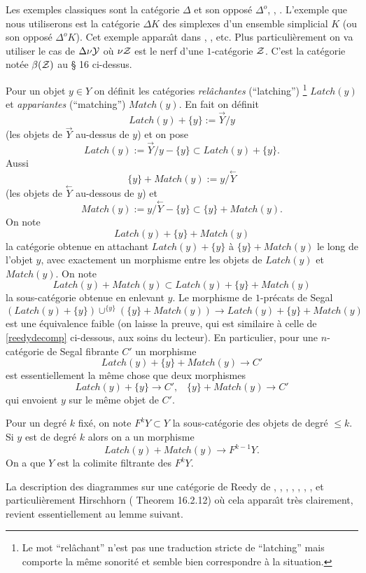 \documentclass[12pt]{article}
\newcommand{\Yy}{{\cal Y}}
\newcommand{\Zz}{{\cal Z}}
\newcommand{\direct}[1]{\stackrel{\rightarrow}{#1}}
\newcommand{\inverse}[1]{\stackrel{\leftarrow}{#1}}
\begin{document}
Les exemples classiques sont la cat\'egorie $\Delta$ et son oppos\'e $\Delta
^o$, \cite{BousfieldKan}, \cite{Reedy}.
L'exemple que nous utiliserons est la cat\'egorie $\Delta K$ des simplexes d'un
ensemble simplicial $K$ (ou son oppos\'e $\Delta ^oK$). Cet exemple
appara\^{\i}t
dans \cite{Hirschhorn}, \cite{DHK}, etc. Plus particuli\`erement on va utiliser
le cas de $\Delta \nu \Yy$ o\`u $\nu \Zz$ est le nerf d'une
$1$-cat\'egorie $\Zz$. C'est la cat\'egorie not\'ee $\beta (\Zz )$ au \S
16 ci-dessus.




Pour un objet $y\in Y$ on d\'efinit les cat\'egories
{\em rel\^achantes} (``latching'')
\footnote{
Le mot ``rel\^achant'' n'est pas une traduction stricte de
``latching'' mais comporte la m\^eme sonorit\'e et semble
bien correspondre \`a la situation.}
$Latch(y)$
et {\em appariantes} (``matching'') $Match(y)$.
En fait on d\'efinit
$$
Latch(y)+\{ y\} := \direct{Y}/y
$$
(les objets de $\direct{Y}$ au-dessus de $y$)
et on pose
$$
Latch(y):= \direct{Y}/y -\{ y\} \subset Latch(y)+\{ y\} .
$$
Aussi
$$
\{ y\} + Match(y):= y/\inverse{Y}
$$
(les objets de $\inverse{Y}$ au-dessous de $y$)
et
$$
Match(y):= y/\inverse{Y} -\{ y\} \subset \{ y\} + Match(y).
$$
On note
$$
Latch(y)+ \{ y\} + Match(y)
$$
la cat\'egorie obtenue en attachant $Latch(y)+\{ y\} $ \`a
$\{ y\} + Match(y) $ le long de
l'objet $y$, avec exactement un morphisme entre les objets de $Latch(y)$ et
$Match(y)$. On note
$$
Latch(y)+Match(y)\subset Latch(y)+ \{ y\} + Match(y)
$$
la sous-cat\'egorie obtenue en enlevant $y$.
Le morphisme de $1$-pr\'ecats de Segal
$$
(Latch(y)+\{ y\} ) \cup ^{\{ y\} } (\{ y\} + Match(y))\rightarrow
Latch(y)+ \{ y\} + Match(y)
$$
est une \'equivalence faible (on laisse la preuve, qui est similaire \`a celle
de \ref{reedydecomp} ci-dessous, aux soins du lecteur). En particulier, pour une
$n$-cat\'egorie de Segal fibrante $C'$ un morphisme
$$
Latch(y)+ \{ y\} + Match(y)\rightarrow C'
$$
est essentiellement la m\^eme chose que deux morphismes
$$
Latch(y)+\{ y\} \rightarrow C', \;\;\; \{ y\} + Match(y) \rightarrow C'
$$
qui envoient $y$ sur le m\^eme objet de $C'$.

Pour un degr\'e $k$  fix\'e, on note $F^kY\subset Y$ la sous-cat\'egorie
des objets de degr\'e $\leq k$. Si $y$ est de degr\'e $k$ alors on a un
morphisme
$$
Latch(y)+Match(y) \rightarrow F^{k-1}Y.
$$
On a que $Y$ est la colimite filtrante des $F^kY$.

La description des diagrammes sur une cat\'egorie de Reedy de \cite{DHK},
\cite{JardineGoerssBook}, \cite{BousfieldKan},
\cite{DwyerE2}, \cite{BousfieldFriedlander}, \cite{Reedy}, \cite{DwyerKan3},
et particuli\`erement Hirschhorn (\cite{Hirschhorn} Theorem 16.2.12) o\`u cela
appara\^{\i}t tr\`es clairement, revient essentiellement au lemme suivant.
\end{document}

